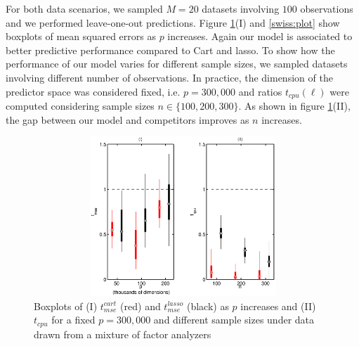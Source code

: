 \documentclass{article} %
\begin{document}
For both data scenarios, we sampled $M=20$ datasets involving $100$ observations and we performed leave-one-out predictions. Figure \ref{MFA:plot}(I) and  \ref{swiss:plot}  show boxplots of mean squared errors as $p$ increases.  Again our model is associated to better predictive performance compared to Cart and lasso. To show how the performance of our model varies for different sample sizes,  we sampled datasets involving different number of observations. In practice, the dimension of the predictor space was considered fixed, i.e. $p=300,000$ and ratios $t_{cpu}(\ell)$ were computed considering sample sizes $n \in \{100,200,300 \}$. As shown in figure \ref{MFA:plot}(II), the  gap between our model and competitors improves as $n$ increases. 


%
%


\begin{figure}[h!]
\centering
\includegraphics[width=140mm,height=60mm]{boxplot_MFA.eps} 
\caption{Boxplots of (I) $t^{cart}_{mse}$ (red) and $t^{lasso}_{mse}$ (black)   as $p$ increases and (II) $t_{cpu}$ for a fixed $p=300,000$ and different sample sizes under data drawn from a mixture of factor analyzers} \label{MFA:plot}
\end{figure}
\end{document}
